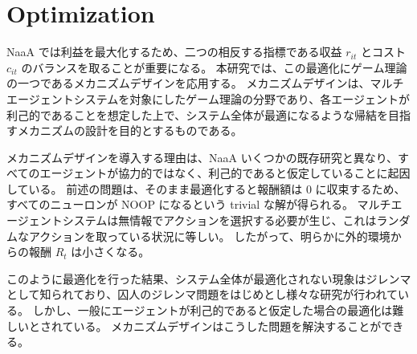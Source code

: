 \section{Optimization}
%
NaaA では利益を最大化するため、二つの相反する指標である収益 $r_{it}$ とコスト $c_{it}$ のバランスを取ることが重要になる。
本研究では、この最適化にゲーム理論の一つであるメカニズムデザインを応用する。
メカニズムデザインは、マルチエージェントシステムを対象にしたゲーム理論の分野であり、各エージェントが利己的であることを想定した上で、システム全体が最適になるような帰結を目指すメカニズムの設計を目的とするものである。

メカニズムデザインを導入する理由は、NaaA いくつかの既存研究と異なり、すべてのエージェントが協力的ではなく、利己的であると仮定していることに起因している。
前述の問題は、そのまま最適化すると報酬額は 0 に収束するため、すべてのニューロンが NOOP になるという trivial な解が得られる。
マルチエージェントシステムは無情報でアクションを選択する必要が生じ、これはランダムなアクションを取っている状況に等しい。
したがって、明らかに外的環境からの報酬 $R_t$ は小さくなる。

このように最適化を行った結果、システム全体が最適化されない現象はジレンマとして知られており、囚人のジレンマ問題をはじめとし様々な研究が行われている。
しかし、一般にエージェントが利己的であると仮定した場合の最適化は難しいとされている。
メカニズムデザインはこうした問題を解決することができる。

%




